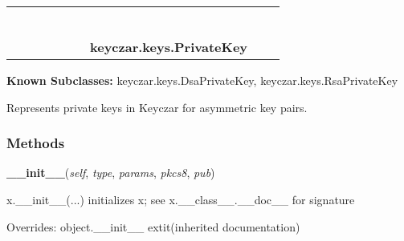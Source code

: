     \label{keyczar:keys:PrivateKey}
\begin{tabular}{cccccccccc}
\multicolumn{2}{r}{\settowidth{\BCL}{object}\multirow{2}{\BCL}{object}}
&&
&&
&&
  \\\cline{3-3}
  &&\multicolumn{1}{c|}{}
&&
&&
&&
  \\
\multicolumn{4}{r}{\settowidth{\BCL}{keyczar.keys.Key}\multirow{2}{\BCL}{keyczar.keys.Key}}
&&
&&
  \\\cline{5-5}
  &&&&\multicolumn{1}{c|}{}
&&
&&
  \\
\multicolumn{6}{r}{\settowidth{\BCL}{keyczar.keys.AsymmetricKey}\multirow{2}{\BCL}{keyczar.keys.AsymmetricKey}}
&&
  \\\cline{7-7}
  &&&&&&\multicolumn{1}{c|}{}
&&
  \\
&&&&&&\multicolumn{2}{l}{\textbf{keyczar.keys.PrivateKey}}
\end{tabular}

\textbf{Known Subclasses:}
keyczar.keys.DsaPrivateKey,
    keyczar.keys.RsaPrivateKey

Represents private keys in Keyczar for asymmetric key pairs.



  \subsubsection{Methods}

    \vspace{0.5ex}

\hspace{.8\funcindent}\begin{boxedminipage}{\funcwidth}

    \raggedright \textbf{\_\_init\_\_}(\textit{self}, \textit{type}, \textit{params}, \textit{pkcs8}, \textit{pub})

\setlength{\parskip}{2ex}
    x.\_\_init\_\_(...) initializes x; see x.\_\_class\_\_.\_\_doc\_\_ for 
    signature

\setlength{\parskip}{1ex}
      Overrides: object.\_\_init\_\_ 	extit{(inherited documentation)}

    \end{boxedminipage}

